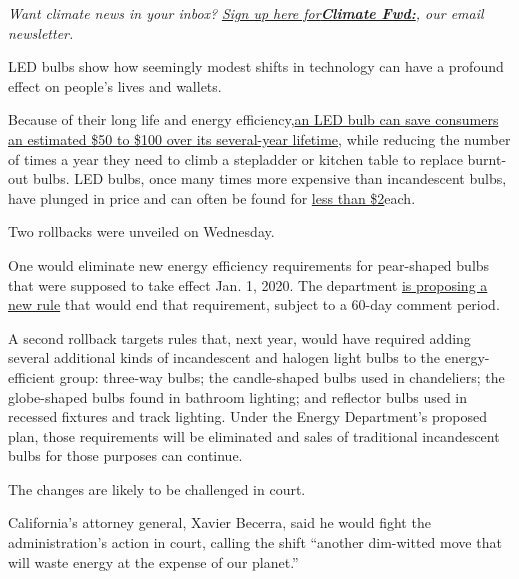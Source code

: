 \emph{Want climate news in your inbox?}
\href{https://www.nytimes3xbfgragh.onion/newsletters/climate-change}{\emph{Sign
up here
for}}\textbf{\href{https://www.nytimes3xbfgragh.onion/newsletters/climate-change}{\emph{Climate
Fwd:}}}\emph{, our email newsletter.}

LED bulbs show how seemingly modest shifts in technology can have a
profound effect on people's lives and wallets.

Because of their long life and energy
efficiency,\href{https://www.energy.gov/energysaver/save-electricity-and-fuel/lighting-choices-save-you-money/how-energy-efficient-light}{an
LED bulb can save consumers}
\href{https://www.nrdc.org/experts/noah-horowitz/annual-cost-light-bulb-standards-rollback-12-billion}{an
estimated \$50 to \$100 over its several-year lifetime}, while reducing
the number of times a year they need to climb a stepladder or kitchen
table to replace burnt-out bulbs. LED bulbs, once many times more
expensive than incandescent bulbs, have plunged in price and can often
be found for
\href{https://www.walmart.com/ip/Great-Value-LED-Light-Bulb-8-5W-60W-Equivalent-A19-Lamp-E26-Medium-Base-Non-Dimmable-Soft-White-4-Pack/51497369}{less
than \$2}each.

Two rollbacks were unveiled on Wednesday.

One would eliminate new energy efficiency requirements for pear-shaped
bulbs that were supposed to take effect Jan. 1, 2020. The department
\href{https://s3.amazonaws.com/public-inspection.federalregister.gov/2019-18941.pdf?utm_source=federalregister.gov\&utm_medium=email\&utm_campaign=pi+subscription+mailing+list}{is
proposing a new rule} that would end that requirement, subject to a
60-day comment period.

A second rollback targets rules that, next year, would have required
adding several additional kinds of incandescent and halogen light bulbs
to the energy-efficient group: three-way bulbs; the candle-shaped bulbs
used in chandeliers; the globe-shaped bulbs found in bathroom lighting;
and reflector bulbs used in recessed fixtures and track lighting. Under
the Energy Department's proposed plan, those requirements will be
eliminated and sales of traditional incandescent bulbs for those
purposes can continue.

The changes are likely to be challenged in court.

California's attorney general, Xavier Becerra, said he would fight the
administration's action in court, calling the shift ``another dim-witted
move that will waste energy at the expense of our planet.''

